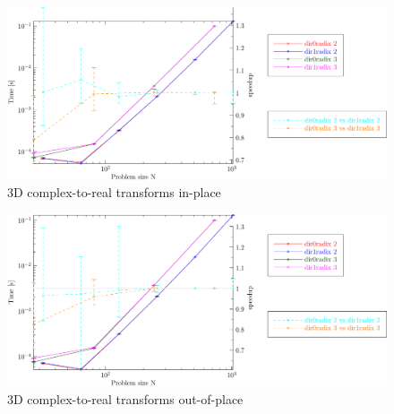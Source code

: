 \documentclass[12pt]{article}
\begin{document}
\centering
\begin{figure}[htbp]
   \includegraphics[width=\textwidth]{3d_c2rinplace_double.pdf}
   \caption{3D complex-to-real transforms in-place}
\end{figure}
\clearpage

\centering
\begin{figure}[htbp]
   \includegraphics[width=\textwidth]{3d_c2routofplace_double.pdf}
   \caption{3D complex-to-real transforms out-of-place}
\end{figure}
\end{document}
